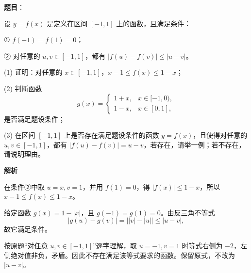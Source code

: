 \begin{answer}

\textbf{题目}：

设 \(y=f(x)\) 是定义在区间 \([-1,1]\) 上的函数，且满足条件：

① \(f(-1)=f(1)=0\)；

② 对任意的 \(u,v\in[-1,1]\)，都有 \(|f(u)-f(v)|\leq|u-v|\)。

(1) 证明：对任意的 \(x\in[-1,1]\)，\(x-1\leq f(x)\leq1-x\)；

(2) 判断函数
\nopagebreak[4]
\[
g(x)=\begin{cases}
1+x,&x\in[-1,0),\\
1-x,&x\in[0,1],
\end{cases}
\]
是否满足题设条件；

(3) 在区间 \([-1,1]\) 上是否存在满足题设条件的函数 \(y=f(x)\)，且使得对任意的 \(u,v\in[-1,1]\)，都有 \(|f(u)-f(v)|=u-v\)，若存在，请举一例；若不存在，请说明理由。

\textbf{解析}


在条件②中取 \(u=x,v=1\)，并用 \(f(1)=0\)，得 \(|f(x)|\le1-x\)，所以 \(x-1\le f(x)\le1-x\)。


给定函数 \(g(x)=1-|x|\)，且 \(g(-1)=g(1)=0\)。由反三角不等式
\nopagebreak[4]
\[
|g(u)-g(v)|=\big||v|-|u|\big|\le|u-v|,
\]
故它满足条件。


按原题“对任意 \(u,v\in[-1,1]\)”逐字理解，取 \(u=-1,v=1\) 时等式右侧为 \(-2\)，左侧绝对值非负，矛盾。因此不存在满足该等式要求的函数。保留原式，不改为 \(|u-v|\)。




\end{answer}